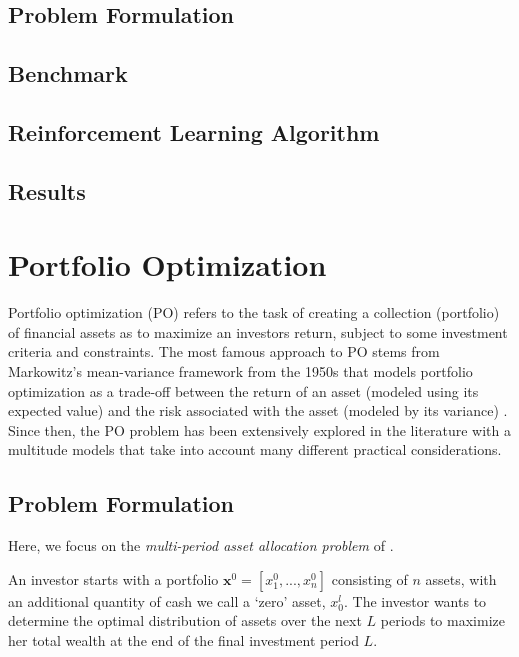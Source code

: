 \documentclass[12pt]{article}
\begin{document}
\subsection{Problem Formulation}

\lipsum[1]

\subsection{Benchmark}

\subsection{Reinforcement Learning Algorithm}

\subsection{Results}

\section{Portfolio Optimization}

Portfolio optimization (PO) refers to the task of creating a collection (portfolio) of financial assets as to maximize an investors return, subject to some investment criteria and constraints. The most famous approach to PO stems from Markowitz's mean-variance framework from the 1950s that models portfolio optimization as a trade-off between the return of an asset (modeled using its expected value) and the risk associated with the asset (modeled by its variance) \cite{Markowitz1952}. 
Since then, the PO problem has been extensively explored in the literature with a multitude models that take into account many different practical considerations. 

\subsection{Problem Formulation}
Here, we focus on the \textit{multi-period asset allocation problem} of \citet{Dantzig1993}. 

An investor starts with a portfolio $\mathbf{x}^0 = [x^0_1,...,x^0_n]$ consisting of $n$ assets, with an additional quantity of cash we call a `zero' asset, $x_0^l$. The investor wants to determine the optimal distribution of assets over the next $L$ periods to maximize her total wealth at the end of the final investment period $L$.
\end{document}

